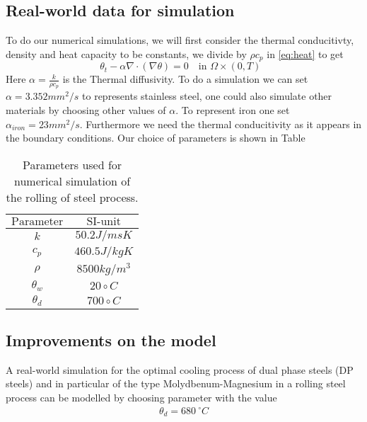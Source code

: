 \subsection{Real-world data for simulation}

To do our numerical simulations, we will first consider the thermal conducitivty, density and heat capacity to be constants, we divide by $\rho c_p$ in \eqref{eq:heat} to get 
\begin{equation*}
    \theta_t - \alpha \nabla \cdot (\nabla \theta) = 0 \quad \text{in $\Omega \times (0,T)$ }
\end{equation*}
Here $\alpha = \frac{k}{\rho c_p}$ is the Thermal diffusivity. To do a simulation we can set $\alpha = 3.352 mm^2/s$ to represents stainless steel, one could also simulate other materials by choosing other values of $\alpha$. To represent iron one set $\alpha_{iron} = 23 mm^2/s$. Furthermore we need the thermal conducitivity as it appears in the boundary conditions. Our choice of parameters is shown in Table 



\begin{table}[h]
    \centering
    \begin{tabular}{c|c}
    $\text{Parameter}$ & $\text{SI-unit}$ \\
    \hline
       $k$& $50.2 J/msK$ \\
        $c_p$ & $460.5 J/kgK$ \\
        $\rho$ & $8500 kg/m^3$ \\
        $\theta_w$ & $20\circ C$ \\
        $\theta_d$ & $700 \circ C$ \\
    \end{tabular}
    \caption{Parameters used for numerical simulation of the rolling of steel process.}
    \label{tab:chosenParam}
\end{table}


\subsection{Improvements on the model}

A real-world simulation for the optimal cooling process of dual phase steels (DP steels) and in particular of the type Molydbenum-Magnesium in a rolling steel process can be modelled by choosing parameter with the value 
\begin{align*}
    \theta_d = 680~^{\circ}C \\
\end{align*}

